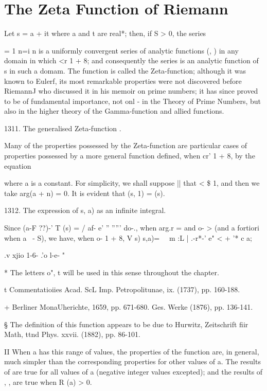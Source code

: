 %
%
\chapter{The Zeta Function of Riemann}


Let s = a + it where a and t are real*; then, if S > 0, the series

= 1 n=i n is a uniformly convergent series of analytic functions
(, ) %
in any domain in which <r 1 + 8; and consequently the
series is an analytic function of s in such a domam. The function is
called the Zeta-function; although it was known to Eulerf, its most
remarkable properties were not discovered before RiemannJ who
discussed it in his memoir on prime numbers; it has since proved to
be of fundamental importance, not onl - in the Theory of Prime
Numbers, but also in the higher theory of the Gamma-function and
allied functions.

1311. The generalised Zeta-function .

Many of the properties possessed by the Zeta-function are particular
cases of properties possessed by a more general function defined, when
cr' 1 + 8, by the equation

where a is a constant. For simplicity, we shall suppose || that < \$
1, and then we take arg(a + n) = 0. It is evident that (s, 1) = (s).

1312. The expression of s, a) as an infinite integral.

Since (a-F ??)-' T (s) = / af- e' '' ''''' do-., when arg.r = and o- >
(and a fortiori when a \ - S), we have, when o- 1 + 8, V s) s,a)= \ \
m :L | .-r*-' e" < + '* c a;

.v xjio 1-6- .'o l-e- "

* The letters o", t will be used in this sense throughout the chapter.

t Commentatioiies Acad. ScL Imp. Petropolitunae, ix. (1737), pp.
160-188.

+ Berliner MonaUherichte, 1659, pp. 671-680. Ges. Werke (1876), pp.
136-141.

§ The definition of this function appears to be due to Hurwitz,
Zeitschrift fiir Math, ttnd Phys. xxvii. (1882), pp. 86-101.

II When a has this range of values, the properties of the function
are, in general, much simpler than the corresponding properties for
other values of a. The results of \hardsubsectionref{13}{1}{4} are true for all values of a
(negative integer values excepted); and the results of \hardsubsectionref{13}{1}{2},
\hardsubsectionref{13}{1}{3}, \hardsectionref{13}{2} are true when R (a) > 0.

